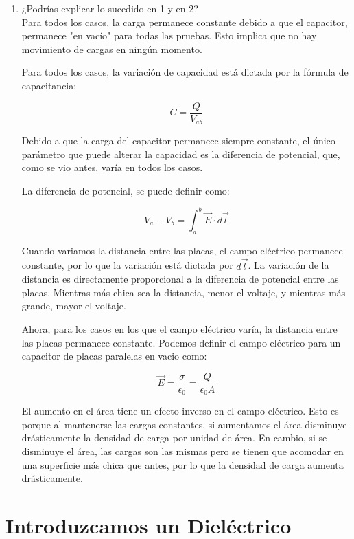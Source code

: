 \documentclass[12pt]{report}
\begin{document}
\begin{enumerate}
\begin{enumerate}
\begin{figure}[h]
\begin{minipage}[h]{0.45\textwidth}
       \end{minipage}
      \end{figure}
        
\newpage

    \end{enumerate}
    \item ¿Podrías explicar lo sucedido en 1 y en 2?\\
    
    Para todos los casos, la carga permanece constante debido a que el capacitor, permanece "en vacío" para todas las pruebas. Esto implica que no hay movimiento de cargas en ningún momento.

    Para todos los casos, la variación de capacidad está dictada por la fórmula de capacitancia:

\[C=\frac{Q}{V_{ab}}\]

    Debido a que la carga del capacitor permanece siempre constante, el único parámetro que puede alterar la capacidad es la diferencia de potencial, que, como se vio antes, varía en todos los casos.
    
    La diferencia de potencial, se puede definir como:
    
\[V_a-V_b=\int_{a}^{b}\vec{E}\cdot d \vec{l}\]

    Cuando variamos la distancia entre las placas, el campo eléctrico permanece constante, por lo que la variación está dictada por \(d \vec{l}\). La variación de la distancia es directamente proporcional a la diferencia de potencial entre las placas. Mientras más chica sea la distancia, menor el voltaje, y mientras más grande, mayor el voltaje.

    Ahora, para los casos en los que el campo eléctrico varía, la distancia entre las placas permanece constante. Podemos definir el campo eléctrico para un capacitor de placas paralelas en vacio como:
    
\[\vec{E}=\frac{\sigma}{\epsilon_0}=\frac{Q}{\epsilon_0 A}\]

    El aumento en el área tiene un efecto inverso en el campo eléctrico. Esto es porque al mantenerse las cargas constantes, si aumentamos el área disminuye drásticamente la densidad de carga por unidad de área. En cambio, si se disminuye el área, las cargas son las mismas pero se tienen que acomodar en una superficie más chica que antes, por lo que la densidad de carga aumenta drásticamente.

\end{enumerate}

\section{Introduzcamos un Dieléctrico}
\end{document}
